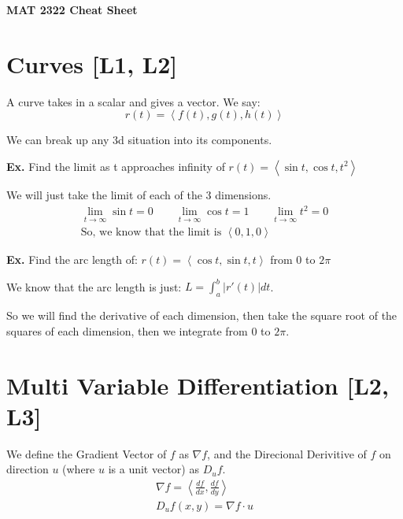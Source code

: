 \documentclass[12pt,letterpaper]{article} \usepackage{amsmath} \usepackage{graphicx} \usepackage[margin=1in]{geometry} \usepackage{longtable}  \usepackage{amssymb}
\begin{document}
	
	\begin{center}
		\Large\textbf{MAT 2322 Cheat Sheet} \\
		\vspace{0.5em}
	\end{center}
	
	\section{Curves [L1, L2]}
	A curve takes in a scalar and gives a vector. We say:
	\begin{equation*}
		r(t)=\left<f(t),g(t),h(t)\right>
	\end{equation*}

	We can break up any 3d situation into its components. 
	
	\begin{mdframed}[]
		\textbf{Ex. } Find the limit as t approaches infinity of $r(t)=\left<\sin t, \cos t, t^2\right>$
	
	We will just take the limit of each of the 3 dimensions. 
	\begin{align*}
		\lim_{t\to\infty} \sin t = 0 \qquad \lim_{t\to\infty} \cos t = 1 \qquad \lim_{t\to\infty} t^2 = 0 \\
    	\text{So, we know that the limit is } \left<0,1,0\right>
	\end{align*}
	\end{mdframed}

	\begin{mdframed}[]
		\textbf{Ex. } Find the arc length of: $r(t) = \left<\cos t, \sin t, t\right>$ from 0 to $2\pi$
		
		We know that the arc length is just: $L = \int_a^{b} |r'(t)|dt$.
		
		So we will find the derivative of each dimension, then take the square root of the squares of each dimension, then we integrate from 0 to $2\pi$.
	\end{mdframed}
	
	\section{Multi Variable Differentiation [L2, L3]}
	We define the Gradient Vector of $f$ as $\nabla f$, and the Direcional Derivitive of $f$ on direction $u$ (where $u$ is a unit vector) as $D_u f$.
	\begin{align*}
		\nabla f = \left<\frac{df}{dx},\frac{df}{dy}\right> \\
		D_u f(x,y) = \nabla f \cdot u
	\end{align*}
\end{document}
